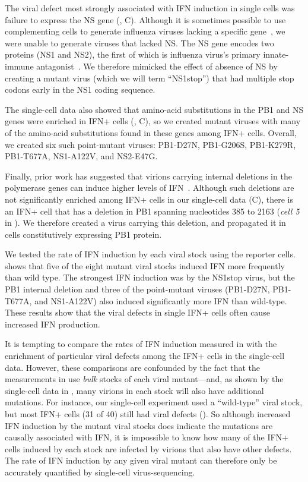 \documentclass[9pt,lineno]{elife}
\begin{document}
The viral defect most strongly associated with IFN induction in single cells was failure to express the NS gene (, C).
Although it is sometimes possible to use complementing cells to generate influenza viruses lacking a specific gene~\citep{fujii2003selective,marsh2007specific}, we were unable to generate viruses that lacked NS.
The NS gene encodes two proteins (NS1 and NS2), the first of which is influenza virus's primary innate-immune antagonist~\citep{garcia1998influenza, hale2008multifunctional}.
We therefore mimicked the effect of absence of NS by creating a mutant virus (which we will term ``NS1stop'') that had multiple stop codons early in the NS1 coding sequence.

The single-cell data also showed that amino-acid substitutions in the PB1 and NS genes were enriched in IFN+ cells (, C), so we created mutant viruses with many of the amino-acid substitutions found in these genes among IFN+ cells.
Overall, we created six such point-mutant viruses: PB1-D27N, PB1-G206S, PB1-K279R, PB1-T677A, NS1-A122V, and NS2-E47G.

Finally, prior work has suggested that virions carrying internal deletions in the polymerase genes can induce higher levels of IFN~\citep{baum2010preference, tapia2013defective, boergeling2015evidence, dimmock2015cloned}.
Although such deletions are not significantly enriched among IFN+ cells in our single-cell data (C), there is an IFN+ cell that has a deletion in PB1 spanning nucleotides 385 to 2163 (\textit{cell 5} in ).
We therefore created a virus carrying this deletion, and propagated it in cells constitutively expressing PB1 protein.

We tested the rate of IFN induction by each viral stock using the reporter cells.
 shows that five of the eight mutant viral stocks induced IFN more frequently than wild type.
The strongest IFN induction was by the NS1stop virus, but the PB1 internal deletion and three of the point-mutant viruses (PB1-D27N, PB1-T677A, and NS1-A122V) also induced significantly more IFN than wild-type.
These results show that the viral defects in single IFN+ cells often cause increased IFN production.

It is tempting to compare the rates of IFN induction measured in  with the enrichment of particular viral defects among the IFN+ cells in the single-cell data.
However, these comparisons are confounded by the fact that the measurements in  use \emph{bulk} stocks of each viral mutant---and, as shown by the single-cell data in , many virions in each stock will also have additional mutations.
For instance, our single-cell experiment used a ``wild-type'' viral stock, but most IFN+ cells (31 of 40) still had viral defects (). 
So although increased IFN induction by the mutant viral stocks does indicate the mutations are causally associated with IFN, it is impossible to know how many of the IFN+ cells induced by each stock are infected by virions that also have other defects.
The rate of IFN induction by any given viral mutant can therefore only be accurately quantified by single-cell virus-sequencing.
\end{document}
